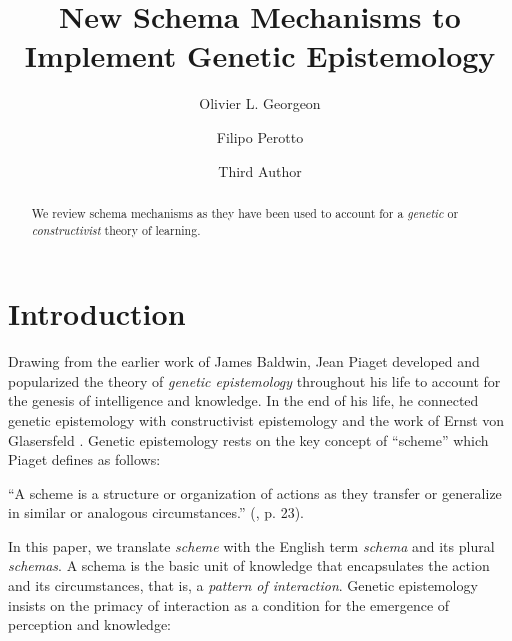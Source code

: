 \documentclass[runningheads]{llncs}
\begin{document}
%
\title{New Schema Mechanisms to Implement Genetic Epistemology}
%
%
\author{Olivier L. Georgeon \and
Filipo Perotto \and
Third Author}
%
%
%
\maketitle              %
%
\begin{abstract}
We review schema mechanisms as they have been used to account for a \textit{genetic} or \textit{constructivist} theory of learning.

\end{abstract}
%
%
%
\section{Introduction}


Drawing from the earlier work of James Baldwin, Jean Piaget developed and popularized the theory of \textit{genetic epistemology} \cite{piaget_principles_1997} throughout his life to account for the genesis of intelligence and knowledge. 
In the end of his life, he connected genetic epistemology with constructivist epistemology and the work of Ernst von Glasersfeld \cite{glasersfeld_radical_1997}. 
Genetic epistemology rests on the key concept of ``scheme'' which Piaget defines as follows: 
\\

\begin{adjustwidth}{1cm}{1cm}
``A scheme is a structure or organization of actions as they transfer or generalize in similar or analogous circumstances.'' 
(\cite{piaget_naissance_1998}, p. 23).
\\ 
\end{adjustwidth}

In this paper, we translate \textit{scheme} with the English term \textit{schema} and its plural \textit{schemas}. 
A schema is the basic unit of knowledge that encapsulates the action and its circumstances, that is, a \textit{pattern of interaction}. 
Genetic epistemology insists on the primacy of interaction as a condition for the emergence of perception and knowledge:
\\
\end{document}
